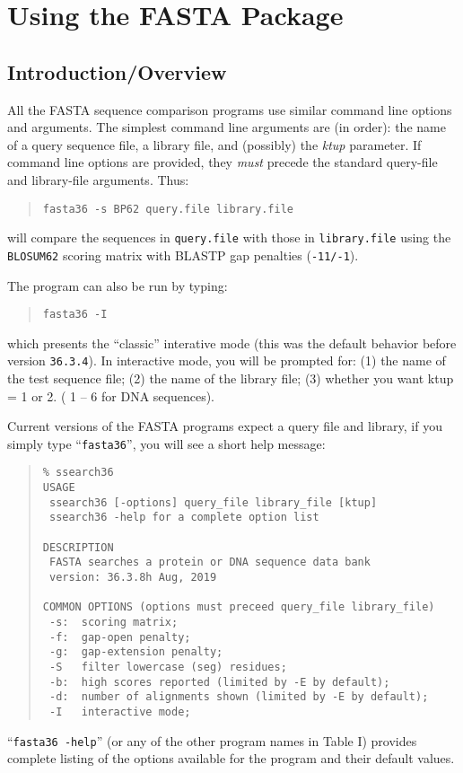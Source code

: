 \documentclass[11pt]{article}
\begin{document}
\section{Using the FASTA Package}
\subsection{Introduction/Overview}

All the FASTA sequence comparison programs use similar command line
options and arguments.  The simplest command line arguments are (in
order): the name of a query sequence file, a library file, and
(possibly) the \emph{ktup} parameter.  If command line options are
provided, they \emph{must} precede the standard query-file and
library-file arguments. Thus:
\begin{quote}
\texttt{fasta36 -s BP62 query.file library.file}
\end{quote}
will compare the sequences in \texttt{query.file} with those in
\texttt{library.file} using the \texttt{BLOSUM62} scoring matrix with
BLASTP gap penalties (\texttt{-11/-1}).

The program can also be run by typing:
\begin{quote}
\texttt{fasta36 -I}
\end{quote}
which presents the ``classic'' interative mode (this was
the default behavior before version \texttt{36.3.4}).
In interactive mode,
you will be prompted for: (1) the name of the test sequence file; (2)
the name of the library file; (3) whether you want ktup = 1 or 2. (
1 -- 6 for DNA sequences).

Current versions of the FASTA programs expect a query file and library, if you simply type ``\texttt{fasta36}'', you will see a short help message:
\begin{footnotesize}
\begin{quote}
\begin{verbatim}
% ssearch36
USAGE
 ssearch36 [-options] query_file library_file [ktup]
 ssearch36 -help for a complete option list

DESCRIPTION
 FASTA searches a protein or DNA sequence data bank
 version: 36.3.8h Aug, 2019

COMMON OPTIONS (options must preceed query_file library_file)
 -s:  scoring matrix;
 -f:  gap-open penalty;
 -g:  gap-extension penalty;
 -S   filter lowercase (seg) residues;
 -b:  high scores reported (limited by -E by default);
 -d:  number of alignments shown (limited by -E by default);
 -I   interactive mode;
\end{verbatim}
\end{quote}
\end{footnotesize}
``\texttt{fasta36 -help}'' (or any of the other program names in Table
I) provides complete listing of the options available for the program
and their default values.
\end{document}
